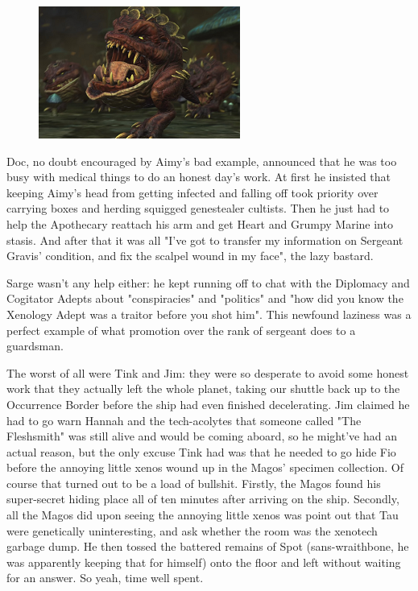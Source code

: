 \begin{figure}
	\begin{center}
		\includegraphics[width=\figwidth]{pics/17/12.png}
	\end{center}
\end{figure}
Doc, no doubt encouraged by Aimy's bad example, announced that he was too busy with medical things to do an honest day's work. 
At first he insisted that keeping Aimy's head from getting infected and falling off took priority over carrying boxes and herding squigged genestealer cultists. 
Then he just had to help the Apothecary reattach his arm and get Heart and Grumpy Marine into stasis. 
And after that it was all "I've got to transfer my information on Sergeant Gravis' condition, and fix the scalpel wound in my face", the lazy bastard.

Sarge wasn't any help either: 
he kept running off to chat with the Diplomacy and Cogitator Adepts about "conspiracies" and "politics" and "how did you know the Xenology Adept was a traitor before you shot him". 
This newfound laziness was a perfect example of what promotion over the rank of sergeant does to a guardsman.

The worst of all were Tink and Jim: 
they were so desperate to avoid some honest work that they actually left the whole planet, taking our shuttle back up to the Occurrence Border before the ship had even finished decelerating. 
Jim claimed he had to go warn Hannah and the tech-acolytes that someone called "The Fleshsmith" was still alive and would be coming aboard, so he might've had an actual reason, but the only excuse Tink had was that he needed to go hide Fio before the annoying little xenos wound up in the Magos' specimen collection. 
Of course that turned out to be a load of bullshit. 
Firstly, the Magos found his super-secret hiding place all of ten minutes after arriving on the ship. 
Secondly, all the Magos did upon seeing the annoying little xenos was point out that Tau were genetically uninteresting, and ask whether the room was the xenotech garbage dump. 
He then tossed the battered remains of Spot (sans-wraithbone, he was apparently keeping that for himself) onto the floor and left without waiting for an answer. 
So yeah, time well spent.

